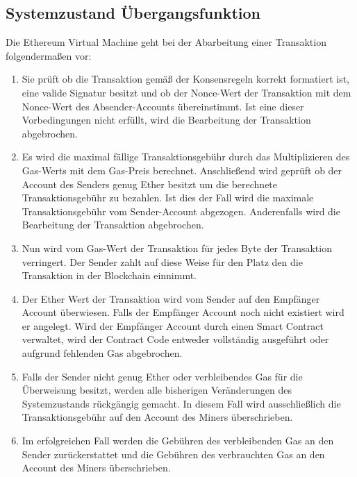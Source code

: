 \subsection{Systemzustand Übergangsfunktion}
Die Ethereum Virtual Machine geht bei der Abarbeitung einer Transaktion folgendermaßen vor:
\begin{enumerate}
\item Sie prüft ob die Transaktion gemäß der Konsensregeln korrekt formatiert ist, eine valide Signatur besitzt und ob der Nonce-Wert der Transaktion mit dem Nonce-Wert des Absender-Accounts übereinstimmt. Ist eine dieser Vorbedingungen nicht erfüllt, wird die Bearbeitung der Transaktion abgebrochen. 
\item Es wird die maximal fällige Transaktionsgebühr durch das Multiplizieren des Gas-Werts mit dem Gas-Preis berechnet. Anschließend wird geprüft ob der Account des Senders genug Ether besitzt um die berechnete Transaktionsgebühr zu bezahlen. Ist dies der Fall wird die maximale Transaktionsgebühr vom Sender-Account abgezogen. Anderenfalls wird die Bearbeitung der Transaktion abgebrochen. 
\item Nun wird vom Gas-Wert der Transaktion für jedes Byte der Transaktion verringert. Der Sender zahlt auf diese Weise für den Platz den die Transaktion in der Blockchain einnimmt.
\item Der Ether Wert der Transaktion wird vom Sender auf den Empfänger Account überwiesen. Falls der Empfänger Account noch nicht existiert wird er angelegt. Wird der Empfänger Account durch einen Smart Contract verwaltet, wird der Contract Code entweder vollständig ausgeführt oder aufgrund fehlenden Gas abgebrochen. 
\item Falls der Sender nicht genug Ether oder verbleibendes Gas für die Überweisung besitzt, werden alle bisherigen Veränderungen des Systemzustands rückgängig gemacht. In diesem Fall wird ausschließlich die Transaktionsgebühr  auf den Account des Miners überschrieben.
\item Im erfolgreichen Fall werden die Gebühren des verbleibenden Gas an den Sender zurückerstattet und die Gebühren des verbrauchten Gas an den Account des Miners überschrieben.
\end{enumerate}

